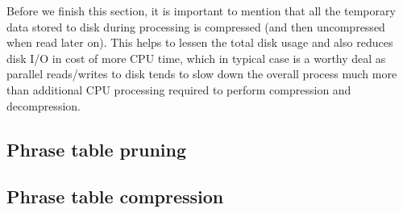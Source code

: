 Before we finish this section, it is important to mention that all
the temporary data stored to disk during processing is compressed
(and then uncompressed when read later on).
This helps to lessen the total disk usage and also reduces disk I/O in cost of
more CPU time, which in typical case is a worthy deal as parallel reads/writes
to disk tends to slow down the overall process much more than additional
CPU processing required to perform compression and decompression.

\subsection{Phrase table pruning}


\subsection{Phrase table compression}

